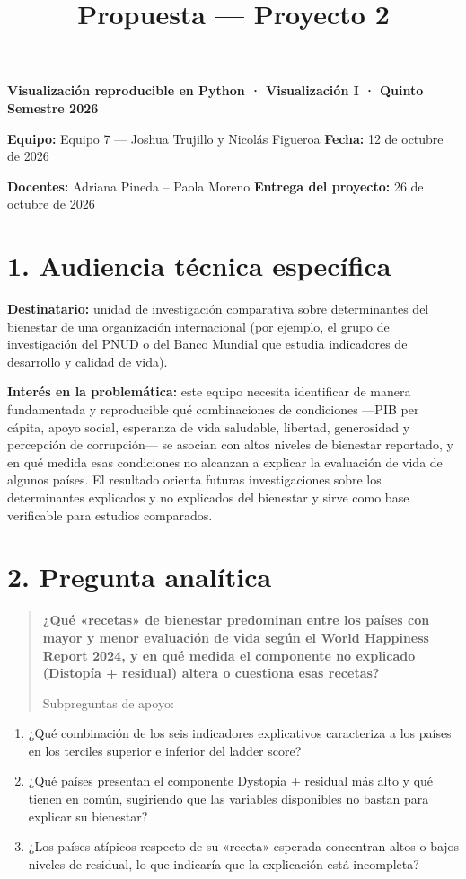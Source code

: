 \documentclass[
]{article}
\title{Propuesta --- Proyecto 2}
\author{}
\date{}
\begin{document}
\maketitle

\textbf{Visualización reproducible en Python · Visualización I · Quinto
Semestre 2026}

\textbf{Equipo:} Equipo 7 --- Joshua Trujillo y Nicolás Figueroa
\textbar{} \textbf{Fecha:} 12 de octubre de 2026

\textbf{Docentes:} Adriana Pineda -- Paola Moreno \textbar{}
\textbf{Entrega del proyecto:} 26 de octubre de 2026

\section{1. Audiencia técnica
específica}\label{audiencia-tuxe9cnica-especuxedfica}

\textbf{Destinatario:} unidad de investigación comparativa sobre
determinantes del bienestar de una organización internacional (por
ejemplo, el grupo de investigación del PNUD o del Banco Mundial que
estudia indicadores de desarrollo y calidad de vida).

\textbf{Interés en la problemática:} este equipo necesita identificar de
manera fundamentada y reproducible qué combinaciones de condiciones
---PIB per cápita, apoyo social, esperanza de vida saludable, libertad,
generosidad y percepción de corrupción--- se asocian con altos niveles
de bienestar reportado, y en qué medida esas condiciones no alcanzan a
explicar la evaluación de vida de algunos países. El resultado orienta
futuras investigaciones sobre los determinantes explicados y no
explicados del bienestar y sirve como base verificable para estudios
comparados.

\section{2. Pregunta analítica}\label{pregunta-analuxedtica}

\begin{quote}
\textbf{¿Qué «recetas» de bienestar predominan entre los países con
mayor y menor evaluación de vida según el World Happiness Report 2024, y
en qué medida el componente no explicado (Distopía + residual) altera o
cuestiona esas recetas?}

Subpreguntas de apoyo:
\end{quote}

\begin{enumerate}
\def\labelenumi{\arabic{enumi}.}
\item
  ¿Qué combinación de los seis indicadores explicativos caracteriza a
  los países en los terciles superior e inferior del ladder score?
\item
  ¿Qué países presentan el componente Dystopia + residual más alto y qué
  tienen en común, sugiriendo que las variables disponibles no bastan
  para explicar su bienestar?
\item
  ¿Los países atípicos respecto de su «receta» esperada concentran altos
  o bajos niveles de residual, lo que indicaría que la explicación está
  incompleta?
\end{enumerate}
\end{document}
